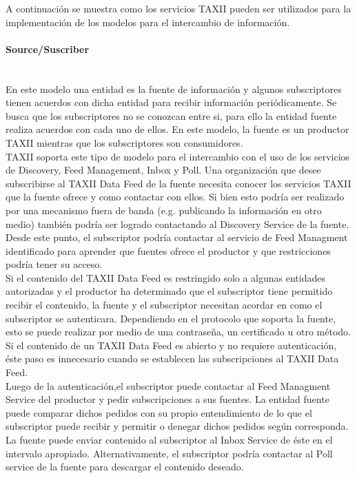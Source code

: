 A continuación se muestra como los servicios TAXII pueden ser utilizados para la 
implementación de los modelos para el intercambio de información.

\paragraph{Source/Suscriber}\ \\

En este modelo una entidad es la fuente de información y algunos subscriptores 
tienen acuerdos con dicha entidad para recibir información periódicamente. Se 
busca que los subscriptores no se conozcan entre si, para ello la entidad fuente 
realiza acuerdos con cada uno de ellos. En este modelo, la fuente es 
un productor TAXII mientras que los subscriptores son consumidores.\\

TAXII soporta este tipo de modelo para el intercambio con el uso de los servicios de 
Discovery, Feed Management, Inbox y Poll. Una organización que desee 
subscribirse al TAXII Data Feed de la fuente necesita conocer los servicios 
TAXII que la fuente ofrece y como contactar con ellos. Si bien esto podría ser 
realizado por una mecanismo fuera de banda (e.g. publicando la información en otro medio)
también podría ser logrado contactando al Discovery Service de la fuente. Desde 
este punto, el subscriptor podría contactar al servicio de Feed Managment 
identificado para aprender que fuentes ofrece el productor y que restricciones 
podría tener su acceso.\\

Si el contenido del TAXII Data Feed es restringido solo a algunas entidades 
autorizadas y el productor ha determinado que el subscriptor tiene permitido 
recibir el contenido, la fuente y el subscriptor necesitan acordar en como el 
subscriptor se autenticara. Dependiendo en el protocolo que soporta la fuente, 
esto se puede realizar por medio de una contraseña, un certificado u otro método. 
Si el contenido de un TAXII Data Feed es abierto y no requiere 
autenticación, éste paso es innecesario cuando se establecen las subscripciones 
al TAXII Data Feed.\\

Luego de la autenticación,el subscriptor puede contactar al Feed Managment Service del 
productor y pedir subscripciones a sus fuentes. La entidad fuente puede 
comparar dichos pedidos con su propio entendimiento de lo que el subscriptor 
puede recibir y permitir o denegar dichos pedidos según corresponda. La fuente 
puede enviar contenido al subscriptor al Inbox Service de éste en el intervalo 
apropiado. Alternativamente, el subscriptor podría contactar al Poll service de 
la fuente para descargar el contenido deseado.\\

